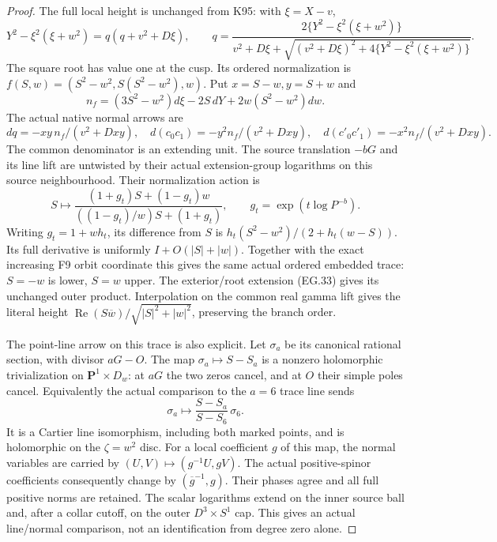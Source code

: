 \begin{proof}
The full local height is unchanged from K95:
with \(\xi=X-v\),
\[
 Y^2-\xi^2(\xi+w^2)=q(q+v^2+D\xi),\qquad
 q=\frac{2\{Y^2-\xi^2(\xi+w^2)\}}
 {v^2+D\xi+\sqrt{(v^2+D\xi)^2+
                    4\{Y^2-\xi^2(\xi+w^2)\}}}.
 \tag{EG.35}
\]
The square root has value one at the cusp.
Its ordered normalization is
\(f(S,w)=(S^2-w^2,S(S^2-w^2),w)\).
Put \(x=S-w,y=S+w\) and
\[
 n_f=(3S^2-w^2)d\xi-2S\,dY+2w(S^2-w^2)dw .
 \]
The actual native normal arrows are
\[
 dq=-xy\,n_f/(v^2+Dxy),\quad
 d(c_0c_1)=-y^2n_f/(v^2+Dxy),\quad
 d(c'_0c'_1)=-x^2n_f/(v^2+Dxy).
 \tag{EG.36}
\]
The common denominator is an extending unit.
The source translation \(-bG\) and its line
lift are untwisted by their actual extension-group
logarithms on this source neighbourhood. Their
normalization action is
\[
 S\longmapsto
 \frac{(1+g_t)S+(1-g_t)w}{((1-g_t)/w)S+(1+g_t)},
 \qquad g_t=\exp(t\log P^{-b}).
 \tag{EG.37}
\]
Writing \(g_t=1+wh_t\), its difference from
\(S\) is \(h_t(S^2-w^2)/(2+h_t(w-S))\).
Its full derivative is uniformly \(I+O(|S|+|w|)\).
Together with the exact increasing F9 orbit
coordinate this gives the same actual ordered
embedded trace: \(S=-w\) is lower, \(S=w\)
upper. The exterior/root extension (EG.33)
gives its unchanged outer product. Interpolation
on the common real gamma lift gives the literal
height \(\operatorname{Re}(S\overline w)/
\sqrt{|S|^2+|w|^2}\), preserving the branch order.

The point-line arrow on this trace is also
explicit. Let \(\sigma_a\) be its canonical
rational section, with divisor \(aG-O\).
The map \(\sigma_a\mapsto S-S_a\) is a
nonzero holomorphic trivialization on
\(\mathbf P^1\times D_w\): at \(aG\) the
two zeros cancel, and at \(O\) their simple
poles cancel. Equivalently the actual
comparison to the \(a=6\) trace line sends
\[
 \sigma_a\longmapsto
       \frac{S-S_a}{S-S_6}\,\sigma_6 .
 \tag{EG.38}
\]
It is a Cartier line isomorphism, including
both marked points, and is holomorphic on
the \(\zeta=w^2\) disc.
For a local coefficient \(g\) of this map,
the normal variables are carried by
\((U,V)\mapsto(g^{-1}U,gV)\). The actual
positive-spinor coefficients consequently
change by \((\overline g^{-1},g)\).
Their phases agree and all full positive
norms are retained. The scalar logarithms
extend on the inner source ball and,
after a collar cutoff, on the outer
\(D^3\times S^1\) cap. This gives an
actual line/normal comparison, not an
identification from degree zero alone.


\end{proof}
